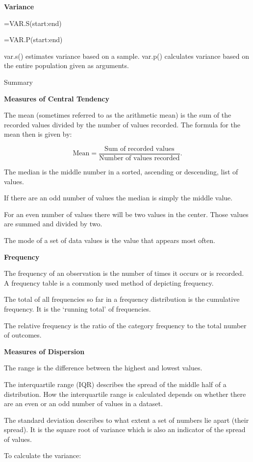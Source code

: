 \documentclass[
]{book}
\begin{document}
\textbf{Variance}

=VAR.S(start:end)

=VAR.P(start:end)

var.s() estimates variance based on a sample. var.p() calculates variance based on the entire population given as arguments.

Summary

\textbf{Measures of Central Tendency}

The mean (sometimes referred to as the arithmetic mean) is the sum of the recorded values divided by the number of values recorded. The formula for the mean then is given by:

\[ \textrm{Mean} = \frac{\textrm{Sum of recorded values}}{\textrm{Number of values recorded}}.\]

The median is the middle number in a sorted, ascending or descending, list of values.

If there are an odd number of values the median is simply the middle value.

For an even number of values there will be two values in the center. Those values are summed and divided by two.

The mode of a set of data values is the value that appears most often.

\textbf{Frequency}

The frequency of an observation is the number of times it occurs or is recorded. A frequency table is a commonly used method of depicting frequency.

The total of all frequencies so far in a frequency distribution is the cumulative frequency. It is the `running total' of frequencies.

The relative frequency is the ratio of the category frequency to the total number of outcomes.

\textbf{Measures of Dispersion}

The range is the difference between the highest and lowest values.

The interquartile range (IQR) describes the spread of the middle half of a distribution. How the interquartile range is calculated depends on whether there are an even or an odd number of values in a dataset.

The standard deviation describes to what extent a set of numbers lie apart (their spread). It is the square root of variance which is also an indicator of the spread of values.

To calculate the variance:
\end{document}
